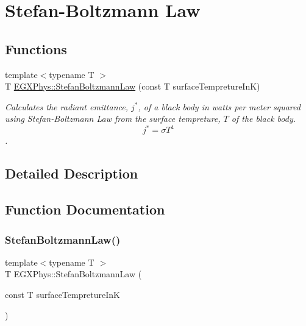 \hypertarget{group___e_g_x_phys-_electrodynamics-_black_body-_stefan_boltzmann_law}{}\section{Stefan-\/\+Boltzmann Law}
\label{group___e_g_x_phys-_electrodynamics-_black_body-_stefan_boltzmann_law}
\subsection*{Functions}
\begin{DoxyCompactItemize}
\item 
{\footnotesize template$<$typename T $>$ }\\T \mbox{\hyperlink{group___e_g_x_phys-_electrodynamics-_black_body-_stefan_boltzmann_law_gadfc1c4242b5364a747169569ae5c84ef}{E\+G\+X\+Phys\+::\+Stefan\+Boltzmann\+Law}} (const T surface\+Tempreture\+InK)
\begin{DoxyCompactList}\small\item\em Calculates the radiant emittance, $j^*$, of a black body in watts per meter squared using Stefan-\/\+Boltzmann Law from the surface tempreture, $T$ of the black body. \[j^*=\sigma T^4\]. \end{DoxyCompactList}\end{DoxyCompactItemize}


\subsection{Detailed Description}


\subsection{Function Documentation}
\mbox{\label{group___e_g_x_phys-_electrodynamics-_black_body-_stefan_boltzmann_law_gadfc1c4242b5364a747169569ae5c84ef}} 
\subsubsection{\texorpdfstring{Stefan\+Boltzmann\+Law()}{StefanBoltzmannLaw()}}
{\footnotesize\ttfamily template$<$typename T $>$ \\
T E\+G\+X\+Phys\+::\+Stefan\+Boltzmann\+Law (\begin{DoxyParamCaption}\item[{const T}]{surface\+Tempreture\+InK }\end{DoxyParamCaption})}



